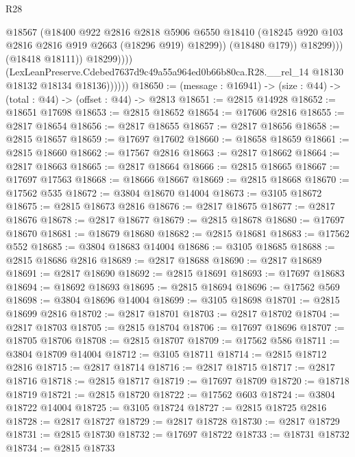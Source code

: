 \begin{lexlean}{R28}
\begin{coremodule}
                                @18567
                                (@18400
                                  @922
                                  @2816
                                  @2818
                                  @5906
                                  @6550
                                  @18410
                                  (@18245 @920 @103 @2816 @2816 @919 @2663 (@18296 @919) @18299))
                                (@18480 @179))
                              @18299)))
                        (@18418 @18111))
                      @18299))))
              (LexLeanPreserve.Cdebed7637d9c49a55a964ed0b66b80ca.R28.__rel_14
                @18130
                @18132
                @18134
                @18136))))))
@18650 := (message : @16941) -> (size : @44) -> (total : @44) -> (offset : @44) -> @2813
@18651 := @2815 @14928
@18652 := @18651 @17698
@18653 := @2815 @18652
@18654 := @17606 @2816
@18655 := @2817 @18654
@18656 := @2817 @18655
@18657 := @2817 @18656
@18658 := @2815 @18657
@18659 := @17697 @17602
@18660 := @18658 @18659
@18661 := @2815 @18660
@18662 := @17567 @2816
@18663 := @2817 @18662
@18664 := @2817 @18663
@18665 := @2817 @18664
@18666 := @2815 @18665
@18667 := @17697 @17563
@18668 := @18666 @18667
@18669 := @2815 @18668
@18670 := @17562 @535
@18672 := @3804 @18670 @14004
@18673 := @3105 @18672
@18675 := @2815 @18673 @2816
@18676 := @2817 @18675
@18677 := @2817 @18676
@18678 := @2817 @18677
@18679 := @2815 @18678
@18680 := @17697 @18670
@18681 := @18679 @18680
@18682 := @2815 @18681
@18683 := @17562 @552
@18685 := @3804 @18683 @14004
@18686 := @3105 @18685
@18688 := @2815 @18686 @2816
@18689 := @2817 @18688
@18690 := @2817 @18689
@18691 := @2817 @18690
@18692 := @2815 @18691
@18693 := @17697 @18683
@18694 := @18692 @18693
@18695 := @2815 @18694
@18696 := @17562 @569
@18698 := @3804 @18696 @14004
@18699 := @3105 @18698
@18701 := @2815 @18699 @2816
@18702 := @2817 @18701
@18703 := @2817 @18702
@18704 := @2817 @18703
@18705 := @2815 @18704
@18706 := @17697 @18696
@18707 := @18705 @18706
@18708 := @2815 @18707
@18709 := @17562 @586
@18711 := @3804 @18709 @14004
@18712 := @3105 @18711
@18714 := @2815 @18712 @2816
@18715 := @2817 @18714
@18716 := @2817 @18715
@18717 := @2817 @18716
@18718 := @2815 @18717
@18719 := @17697 @18709
@18720 := @18718 @18719
@18721 := @2815 @18720
@18722 := @17562 @603
@18724 := @3804 @18722 @14004
@18725 := @3105 @18724
@18727 := @2815 @18725 @2816
@18728 := @2817 @18727
@18729 := @2817 @18728
@18730 := @2817 @18729
@18731 := @2815 @18730
@18732 := @17697 @18722
@18733 := @18731 @18732
@18734 := @2815 @18733

\end{coremodule}
\end{lexlean}
